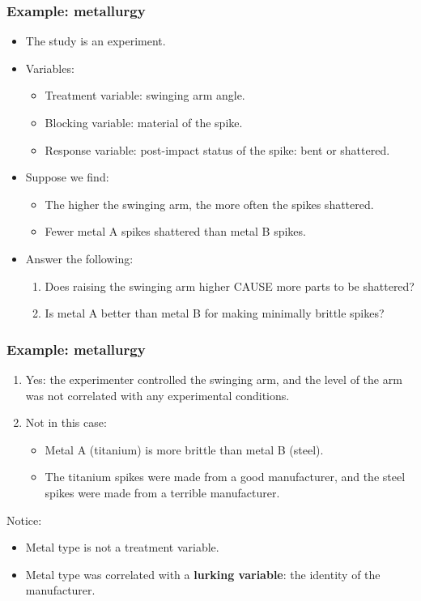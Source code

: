 \documentclass[handout]{beamer}\usepackage{graphicx, color}
\numberwithin{equation}{section}
\begin{document}
\begin{frame}
\frametitle{Example: metallurgy}
\begin{itemize}
\item The study is an experiment. 
\pause \item Variables:
\begin{itemize}
\item Treatment variable: swinging arm angle.
\pause \item Blocking variable: material of the spike.
\pause \item Response variable: post-impact status of the spike: bent or shattered.
\end{itemize}

\pause \item Suppose we find:
\begin{itemize}
\item The higher the swinging arm, the more often the spikes shattered.
\pause \item Fewer metal A spikes shattered than metal B spikes.
\end{itemize}
\pause \item Answer the following:
\begin{enumerate}
\item Does raising the swinging arm higher CAUSE more parts to be shattered?
\pause \item Is metal A better than metal B for making minimally brittle spikes?
\end{enumerate}
\end{itemize}
\end{frame}

\begin{frame}
\frametitle{Example: metallurgy}
\begin{enumerate}[1. ]
\item Yes: the experimenter controlled the swinging arm, and the level of the arm was not correlated with any experimental conditions.
\item Not in this case: 
\begin{itemize}
\item Metal A (titanium) is more brittle than metal B (steel).
\item The titanium spikes were made from a good manufacturer, and the steel spikes were made from a terrible manufacturer. 
\end{itemize}
\end{enumerate}

Notice: 
\begin{itemize}
\item Metal type is not a treatment variable.
\item Metal type was correlated with a {\bf lurking variable}: the identity of the manufacturer.
\end{itemize}
\end{frame}
\end{document}
